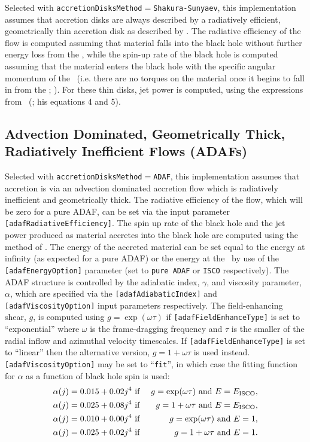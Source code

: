 Selected with {\tt accretionDisksMethod}$=${\tt Shakura-Sunyaev}, this implementation assumes that accretion disks are always described by a radiatively efficient, geometrically thin accretion disk as described by \cite{shakura_black_1973}. The radiative efficiency of the flow is computed assuming that material falls into the black hole without further energy loss from the \ISCO, while the spin-up rate of the black hole is computed assuming that the material enters the black hole with the specific angular momentum of the \ISCO\ (i.e. there are no torques on the material once it begins to fall in from the \ISCO; \citealt{bardeen_kerr_1970}). For these thin disks, jet power is computed, using the expressions from \citeauthor{meier_association_2001}~(\citeyear{meier_association_2001}; his equations 4 and 5).

\subsection{Advection Dominated, Geometrically Thick, Radiatively Inefficient Flows (ADAFs)}

Selected with {\tt accretionDisksMethod}$=${\tt ADAF}, this implementation assumes that accretion is via an advection dominated accretion flow \citep{narayan_advection-dominated_1994} which is radiatively inefficient and geometrically thick. The radiative efficiency of the flow, which will be zero for a pure ADAF, can be set via the input parameter {\tt [adafRadiativeEfficiency]}. The spin up rate of the black hole and the jet power produced as material accretes into the black hole are computed using the method of \cite{benson_maximum_2009}. The energy of the accreted material can be set equal to the energy at infinity (as expected for a pure ADAF) or the energy at the \ISCO\ by use of the {\tt [adafEnergyOption]} parameter (set to {\tt pure ADAF} or {\tt ISCO} respectively). The ADAF structure is controlled by the adiabatic index, $\gamma$, and viscosity parameter, $\alpha$, which are specified via the {\tt [adafAdiabaticIndex]} and {\tt [adafViscosityOption]} input parameters respectively. The field-enhancing shear, $g$, is computed using $g=\exp(\omega \tau)$ if {\tt [adafFieldEnhanceType]} is set to ``exponential'' where $\omega$ is the frame-dragging frequency and $\tau$ is the smaller of the radial inflow and azimuthal velocity timescales. If  {\tt [adafFieldEnhanceType]} is set to ``linear'' then the alternative version, $g=1+\omega \tau$ is used instead. {\tt [adafViscosityOption]} may be set to ``{\tt fit}'', in which case the fitting function for $\alpha$ as a function of black hole spin is used:
\begin{eqnarray}
\alpha(j)=0.015+0.02 j^4 & \hbox{ if  }& g=\exp(\omega\tau) \hbox{ and } E=E_{\rm ISCO}, \\
\alpha(j)=0.025+0.08 j^4 & \hbox{ if } & g=1+\omega\tau \hbox{ and } E=E_{\rm ISCO}, \\
\alpha(j)=0.010+0.00 j^4 & \hbox{ if } & g=\exp(\omega\tau) \hbox{ and } E=1, \\
\alpha(j)=0.025+0.02 j^4 & \hbox{ if } & g=1+\omega\tau \hbox{ and } E=1.  
\end{eqnarray}

